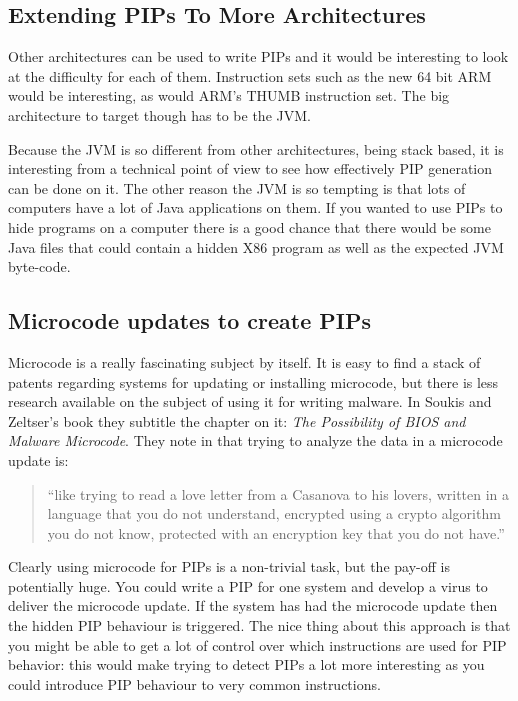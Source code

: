 \documentclass[10pt]{book}
\begin{document}
\subsection{Extending PIPs To More Architectures}

Other architectures can be used to write PIPs and it would be
interesting to look at the difficulty for each of them. Instruction sets
such as the new 64 bit ARM would be interesting, as would ARM's THUMB
instruction set. The big architecture to target though has to be the
JVM.

Because the JVM is so different from other architectures, being stack
based, it is interesting from a technical point of view to see how
effectively PIP generation can be done on it. The other reason the JVM
is so tempting is that lots of computers have a lot of Java applications
on them. If you wanted to use PIPs to hide programs on a computer there
is a good chance that there would be some Java files that could contain
a hidden X86 program as well as the expected JVM byte-code.

\subsection{Microcode updates to create PIPs}

Microcode is a really fascinating subject by itself. It is easy to find
a stack of patents regarding systems for updating or installing
microcode\autocite{Demke:2000uf}\autocite{Tung:2004tm}\autocite{Langford:2006uf},
but there is less research available on the subject of using it for
writing malware. In Soukis and Zeltser's book \autocite{Skoudis:2004to}
they subtitle the chapter on it: \emph{The Possibility of BIOS and
Malware Microcode}. They note in \autocite{Skoudis:2004to} that trying
to analyze the data in a microcode update is:

\begin{quote}
``like trying to read a love letter from a Casanova to his lovers,
written in a language that you do not understand, encrypted using a
crypto algorithm you do not know, protected with an encryption key that
you do not have.''

\end{quote}
Clearly using microcode for PIPs is a non-trivial task, but the pay-off
is potentially huge. You could write a PIP for one system and develop a
virus to deliver the microcode update. If the system has had the
microcode update then the hidden PIP behaviour is triggered. The nice
thing about this approach is that you might be able to get a lot of
control over which instructions are used for PIP behavior: this would
make trying to detect PIPs a lot more interesting as you could introduce
PIP behaviour to very common instructions.
\end{document}
